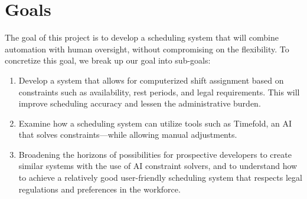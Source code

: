 \documentclass[nomenclature, english, bibtex]{kththesis}
\newcommand*{\generalExpl}[1]{\todo[inline]{#1}}
\newcommand*{\sweExpl}[1]{\todo[inline, backgroundcolor=kth-lightblue40]{#1}}  %
\begin{document}
\section{Goals}



The goal of this project is to develop a scheduling system that will combine automation with human oversight, without compromising on the flexibility. To concretize this goal, we break up our goal into sub-goals:

\begin{enumerate}
    \item Develop a system that allows for computerized shift assignment based on constraints such as availability, rest periods, and legal requirements. This will improve scheduling accuracy and lessen the administrative burden.

    \item Examine how a scheduling system can utilize tools such as Timefold, an AI that solves constraints—while allowing manual adjustments. 

    \item Broadening the horizons of possibilities for prospective developers to create similar systems with the use of AI constraint solvers, and to understand how to achieve a relatively good user-friendly scheduling system that respects legal regulations and preferences in the workforce. 
\end{enumerate}
\end{document}

